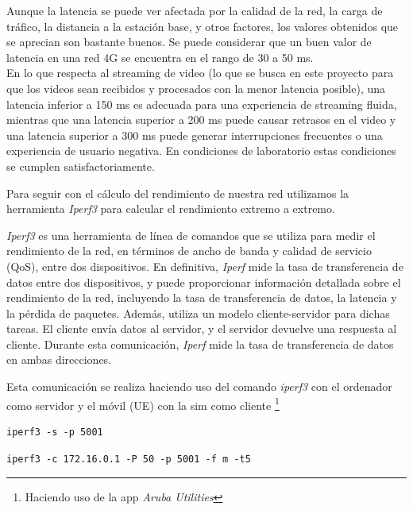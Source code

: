 Aunque la latencia se puede ver afectada por la calidad de la red, la carga de tráfico, la distancia a la estación base, y otros factores, los valores obtenidos que se aprecian son bastante buenos. Se puede considerar que un buen valor de latencia en una red 4G se encuentra en el rango de 30 a 50 ms.\\
En lo que respecta al streaming de video (lo que se busca en este proyecto para que los videos sean recibidos y procesados con la menor latencia posible), una latencia inferior a 150 ms es adecuada para una experiencia de streaming fluida, mientras que una latencia superior a 200 ms puede causar retrasos en el video y una latencia superior a 300 ms puede generar interrupciones frecuentes o una experiencia de usuario negativa. En condiciones de laboratorio estas condiciones se cumplen satisfactoriamente. 

Para seguir con el cálculo del rendimiento de nuestra red utilizamos la herramienta \textit{Iperf3} para calcular el rendimiento extremo a extremo.  

\textit{Iperf3} es una herramienta de línea de comandos que se utiliza para medir el rendimiento de la red, en términos de ancho de banda y calidad de servicio (QoS), entre dos dispositivos. En definitiva, \textit{Iperf} mide la tasa de transferencia de datos entre dos dispositivos, y puede proporcionar información detallada sobre el rendimiento de la red, incluyendo la tasa de transferencia de datos, la latencia y la pérdida de paquetes. Además, utiliza un modelo cliente-servidor para dichas tareas.
El cliente envía datos al servidor, y el servidor devuelve una respuesta al cliente. Durante esta comunicación, \textit{Iperf} mide la tasa de transferencia de datos en ambas direcciones.

Esta comunicación se realiza haciendo uso del comando \textit{iperf3} con el ordenador como servidor y el móvil (UE) con la sim como cliente \footnote{Haciendo uso de la app \textit{Aruba Utilities}}

\begin{verbatim}
iperf3 -s -p 5001
\end{verbatim}

\begin{verbatim}
iperf3 -c 172.16.0.1 -P 50 -p 5001 -f m -t5
\end{verbatim}



